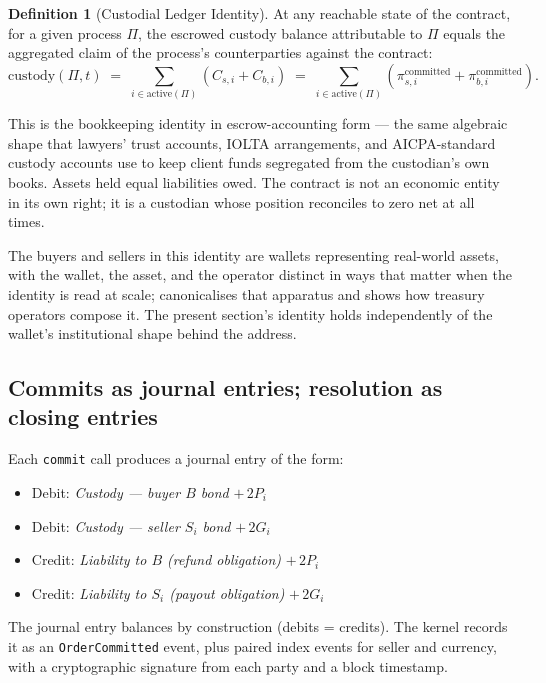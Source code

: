 \documentclass[11pt,a4paper]{article}
\theoremstyle{definition}
\newtheorem{definition}{Definition}[section]
\theoremstyle{remark}
\begin{document}
\begin{definition}[Custodial Ledger Identity]
\label{def:custodial-identity}
At any reachable state of the contract, for a given process
$\Pi$, the escrowed custody balance attributable to $\Pi$
equals the aggregated claim of the process's counterparties
against the contract:
\begin{equation}
  \text{custody}(\Pi, t) \;=\;
  \sum_{i \in \text{active}(\Pi)} (C_{s,i} + C_{b,i})
  \;=\;
  \sum_{i \in \text{active}(\Pi)} (\pi_{s,i}^{\text{committed}} +
  \pi_{b,i}^{\text{committed}}).
\end{equation}
\end{definition}

This is the bookkeeping identity in escrow-accounting form
--- the same algebraic shape that lawyers' trust accounts,
IOLTA arrangements, and AICPA-standard custody accounts use to
keep client funds segregated from the custodian's own books.
Assets held equal liabilities owed. The contract is not an
economic entity in its own right; it is a custodian whose
position reconciles to zero net at all times.

The buyers and sellers in this identity are wallets
representing real-world assets, with the wallet, the asset,
and the operator distinct in ways that matter when the
identity is read at scale; 
canonicalises that apparatus and shows how treasury operators
compose it. The present section's identity holds independently
of the wallet's institutional shape behind the address.

\subsection{Commits as journal entries; resolution as closing entries}

Each \texttt{commit} call produces a journal entry of the
form:
\begin{itemize}
  \item Debit: \emph{Custody --- buyer $B$ bond} \quad $+\, 2P_i$
  \item Debit: \emph{Custody --- seller $S_i$ bond} \quad $+\, 2G_i$
  \item Credit: \emph{Liability to $B$ (refund obligation)} \quad $+\, 2P_i$
  \item Credit: \emph{Liability to $S_i$ (payout obligation)} \quad $+\, 2G_i$
\end{itemize}

The journal entry balances by construction (debits = credits).
The kernel records it as an \texttt{OrderCommitted} event,
plus paired index events for seller and currency, with a
cryptographic signature from each party and a block timestamp.
\end{document}
